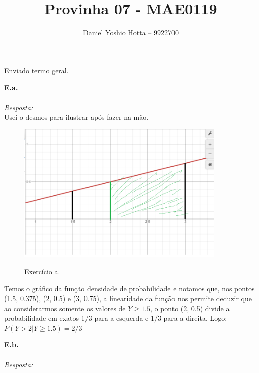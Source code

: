 \documentclass{article}
\begin{document}
	
	\title{Provinha 07 - MAE0119}
	\author{Daniel Yoshio Hotta – 9922700}
	
	\maketitle	
	
		Enviado termo geral.
	
	\textbf {E.a.} 
	\\ \\
	\textit {Resposta:} \\
	
	Usei o desmos para ilustrar após fazer na mão. 
    
    \begin{figure}[h]
    	\caption{Exercício a.}
    	\centering %
    	\includegraphics[width=10cm]{a.png} %
    	\label{figura:ex.a}
    \end{figure}

    Temos o gráfico da função densidade de probabilidade e notamos que, nos pontos (1.5, 0.375), (2, 0.5) e (3, 0.75), a linearidade da função nos permite deduzir que ao considerarmos somente os valores de $Y \geq 1.5$, o ponto (2, 0.5) divide a probabilidade em exatos 1/3 para a esquerda e 1/3 para a direita. Logo:\\

    $P(Y>2 | Y \geq 1.5) = 2/3$
    
    \textbf {E.b.} 
    \\ \\
    \textit {Resposta:} \\
    
    
	
	
	
\end{document}
